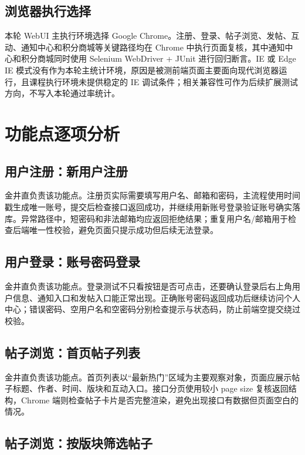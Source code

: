 \documentclass[bwprint]{report}
\begin{document}
\subsection{浏览器执行选择}
本轮 WebUI 主执行环境选择 Google Chrome。注册、登录、帖子浏览、发帖、互动、通知中心和积分商城等关键路径均在 Chrome 中执行页面复核，其中通知中心和积分商城同时使用 Selenium WebDriver + JUnit 进行回归断言。IE 或 Edge IE 模式没有作为本轮主统计环境，原因是被测前端页面主要面向现代浏览器运行，且课程执行环境未提供稳定的 IE 调试条件；相关兼容性可作为后续扩展测试方向，不写入本轮通过率统计。

\section{功能点逐项分析}

\subsection{用户注册：新用户注册}

金井直负责该功能点。注册页实际需要填写用户名、邮箱和密码，主流程使用时间戳生成唯一账号，提交后检查接口返回成功，并继续用新账号登录验证账号确实落库。异常路径中，短密码和非法邮箱均应返回拒绝结果；重复用户名/邮箱用于检查后端唯一性校验，避免页面只提示成功但后续无法登录。

\subsection{用户登录：账号密码登录}

金井直负责该功能点。登录测试不只看按钮是否可点击，还要确认登录后右上角用户信息、通知入口和发帖入口能正常出现。正确账号密码返回成功后继续访问个人中心；错误密码、空用户名和空密码分别检查提示与状态码，防止前端空提交绕过校验。

\subsection{帖子浏览：首页帖子列表}

金井直负责该功能点。首页列表以“最新热门”区域为主要观察对象，页面应展示帖子标题、作者、时间、版块和互动入口。接口分页使用较小 page size 复核返回结构，Chrome 端则检查帖子卡片是否完整渲染，避免出现接口有数据但页面空白的情况。

\subsection{帖子浏览：按版块筛选帖子}
\end{document}
